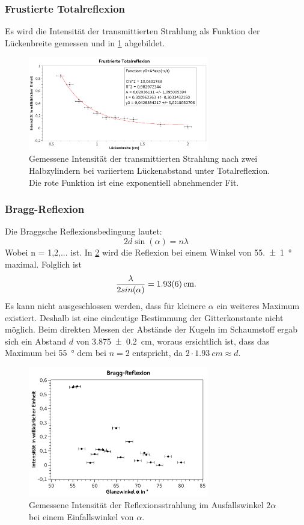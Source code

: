 \documentclass[
	a4paper,
	12pt,
	pagesize,
	ngerman
]{scrartcl}
\begin{document}
	\subsubsection{Frustierte Totalreflexion}
	Es wird die Intensität der transmittierten Strahlung als Funktion der Lückenbreite gemessen und in \cref{fig_frust_total} abgebildet.
	\begin{figure}[H]
		\includegraphics[width=0.7\textwidth]{fig_frust_total}
		\centering
		\caption{Gemessene Intensität der transmittierten Strahlung nach zwei Halbzylindern bei variiertem Lückenabstand unter Totalreflexion. Die rote Funktion ist eine exponentiell abnehmender Fit.}
		\label{fig_frust_total}
		\centering
	\end{figure}

	\subsubsection{Bragg-Reflexion}
	Die Braggsche Reflexionsbedingung lautet:
	\begin{equation}
		2d \sin(\alpha) = n \lambda
	\end{equation}
	Wobei n = 1,2,... ist.
	In \cref{fig_bragg} wird die Reflexion bei einem Winkel von \SI{55,+-1}{\degree} maximal.
	Folglich ist 
	\begin{equation*}
		\frac{\lambda}{2sin(\alpha)} = \SI{1,93+-0,06}{cm}.
	\end{equation*}
	Es kann nicht ausgeschlossen werden, dass für kleinere $\alpha$ ein weiteres Maximum existiert.
	Deshalb ist eine eindeutige Bestimmung der Gitterkonstante nicht möglich.
	Beim direkten Messen der Abstände der Kugeln im Schaumstoff ergab sich ein Abstand $d$ von \SI{3,875+-0,2}{cm}, woraus ersichtlich ist, dass das Maximum bei \SI{55}{\degree} dem bei $n=2$ entspricht, da $2\cdot\SI{1,93}{cm} \approx d$. 
	\begin{figure}[H]
		\includegraphics[width=0.7\textwidth]{fig_bragg}
		\centering
		\caption{Gemessene Intensität der Reflexionsstrahlung im Ausfallswinkel $2\alpha$ bei einem Einfallswinkel von $\alpha$.}
		\label{fig_bragg}
		\centering
	\end{figure}
\end{document}
